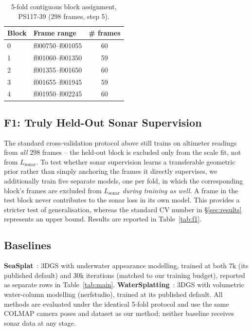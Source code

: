 \documentclass[conference]{IEEEtran}
\begin{document}
\begin{table}[t]
\centering
\caption{5-fold contiguous block assignment, PS117-39 (298 frames, step 5).}
\label{tab:folds}
\begin{tabular}{@{}llc@{}}
\toprule
Block & Frame range & \# frames \\
\midrule
0 & f000750--f001055 & 60 \\
1 & f001060--f001350 & 59 \\
2 & f001355--f001650 & 60 \\
3 & f001655--f001945 & 59 \\
4 & f001950--f002245 & 60 \\
\bottomrule
\end{tabular}
\end{table}

\subsection{F1: Truly Held-Out Sonar Supervision}
\label{sec:f1}

The standard cross-validation protocol above still trains on altimeter
readings from \emph{all} 298 frames -- the held-out block is excluded only
from the scale fit, not from $L_{\text{sonar}}$. To test whether sonar
supervision learns a transferable geometric prior rather than simply
anchoring the frames it directly supervises, we additionally train five
separate models, one per fold, in which the corresponding block's frames are
excluded from $L_{\text{sonar}}$ \emph{during training as well}. A frame in
the test block never contributes to the sonar loss in its own model.
This provides a stricter test of generalisation, whereas the standard CV number
in \S\ref{sec:results} represents an upper bound. Results are reported in Table~\ref{tab:f1}.

\subsection{Baselines}

\textbf{SeaSplat}~\cite{yang2025seasplat}: 3DGS with underwater appearance
modelling, trained at both $7$k (its published default) and $30$k
iterations (matched to our training budget), reported as separate rows in
Table~\ref{tab:main}. \textbf{WaterSplatting}~\cite{li2025watersplatting}:
3DGS with volumetric water-column modelling (nerfstudio), trained at its
published default. All methods are evaluated under the identical 5-fold
protocol and use the same COLMAP camera poses and dataset as our method;
neither baseline receives sonar data at any stage.
\end{document}
